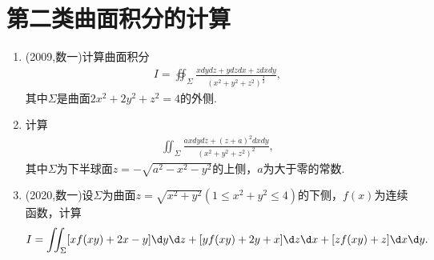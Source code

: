 \documentclass[12pt, a4paper, oneside, UTF8]{ctexbook}
\begin{document}
\section{第二类曲面积分的计算}

\begin{enumerate}[label=\arabic*.,start=8]
    \item (2009,数一)计算曲面积分
    \begin{align*}
    I=\oiint_{\Sigma}\frac{xdydz+ydzdx+zdxdy}{(x^2+y^2+z^2)^{\frac{3}{2}}},
    \end{align*}
    其中$\Sigma$是曲面$2x^2+2y^2+z^2=4$的外侧.
    
    \begin{solution}
    \newpage
    \end{solution}
    
    \item 计算
    \begin{align*}
    \iint_{\Sigma}\frac{axdydz+(z+a)^2dxdy}{(x^2+y^2+z^2)^2},
    \end{align*}
    其中$\Sigma$为下半球面$z=-\sqrt{a^2-x^2-y^2}$的上侧，$a$为大于零的常数.
    
    \begin{solution}
    \newpage
    \end{solution}
    
    \item (2020,数一)设$\Sigma$为曲面$z=\sqrt{x^2+y^2}(1\leq x^2+y^2\leq 4)$的下侧，$f(x)$为连续函数，计算
    \begin{align*}
    I=\iint_{\Sigma}[xf(xy)+2x-y]\d y\d z+[yf(xy)+2y+x]\d z\d x+[zf(xy)+z]\d x\d y.
    \end{align*}
    
    \begin{solution}
    \newpage
    \end{solution}
\end{enumerate}

\ifx\allfiles\undefined
\end{document}
